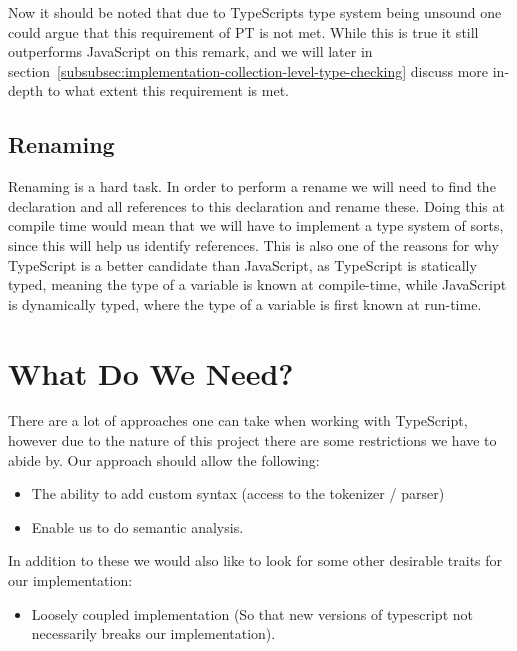 Now it should be noted that due to TypeScripts type system being unsound one could argue that this requirement of PT is not met.
While this is true it still outperforms JavaScript on this remark, and we will later in section~\vref{subsubsec:implementation-collection-level-type-checking} discuss more in-depth to what extent this requirement is met.

\subsection{Renaming}\label{subsec:ts-vs-js-renaming}

Renaming is a hard task.
In order to perform a rename we will need to find the declaration and all references to this declaration and rename these.
Doing this at compile time would mean that we will have to implement a type system of sorts, since this will help us identify references.
This is also one of the reasons for why TypeScript is a better candidate than JavaScript, as TypeScript is statically typed, meaning the type of a variable is known at compile-time, while JavaScript is dynamically typed, where the type of a variable is first known at run-time.

\section{What Do We Need?}\label{sec:what-do-we-need}

There are a lot of approaches one can take when working with TypeScript, however due to the nature of this project there are some restrictions we have to abide by.
Our approach should allow the following:

\begin{itemize}
    \item The ability to add custom syntax (access to the tokenizer / parser)
    \item Enable us to do semantic analysis.
\end{itemize}

In addition to these we would also like to look for some other desirable traits for our implementation:

\begin{itemize}
    \item Loosely coupled implementation (So that new versions of typescript not necessarily breaks our implementation).
\end{itemize}


